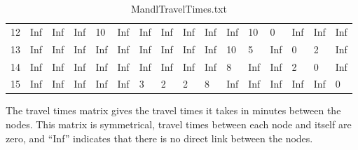 \begin{table}[H]
{\begin{tabular}{|l|lllllllllllllll|}
    12 & Inf     & Inf      & Inf     & 10        & Inf      & Inf       & Inf      &  Inf     &  Inf     &  Inf     &  10     & 0           & Inf      & Inf       & Inf   \\
    13 & Inf     & Inf      & Inf     &  Inf      &  Inf     & Inf       &  Inf     &  Inf     &  Inf     & 10       &  5      & Inf         &  0       & 2         &  Inf  \\
    14 & Inf     & Inf      &  Inf    &  Inf      &  Inf     & Inf       &  Inf     & Inf      & Inf      & 8        &  Inf    &  Inf        & 2        & 0         &   Inf \\
    15 & Inf     & Inf      & Inf     & Inf       & Inf      & 3         &  2       &  2       & 8        & Inf      & Inf     &
     Inf         &  Inf     & Inf       &  0    \\
     \hline
    \end{tabular}
}
    \caption {MandlTravelTimes.txt}
    \label{table:MandlTravelTimes}
    The travel times matrix gives the travel times it takes in minutes between the nodes. This matrix is symmetrical, travel times between each node and itself are zero, and ``Inf'' indicates that there is no direct link between the nodes.
\end{table}

